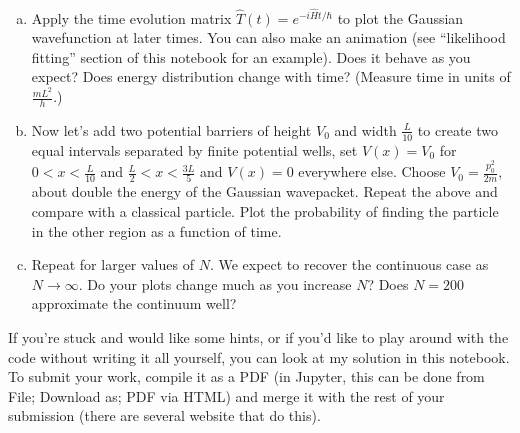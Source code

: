 \documentclass[10pt]{article}
\begin{document}
\begin{enumerate}[(a)]
        \item Apply the time evolution matrix $\hat T(t) = e^{-i\hat H t/\hbar}$ to plot the Gaussian wavefunction at later times. You can also make an animation (see ``likelihood fitting'' section of this notebook for an example). Does it behave as you expect? Does energy distribution change with time? (Measure time in units of $\frac{mL^2}{h}$.)
        \item Now let's add two potential barriers of height $V_0$ and width $\frac{L}{10}$ to create two equal intervals separated by finite potential wells, set $V(x) = V_0$ for $0 < x < \frac{L}{10}$ and $\frac{L}{2} < x < \frac{3L}{5}$ and $V(x) = 0$ everywhere else. Choose $V_0 = \frac{p_0^2}{2m}$, about double the energy of the Gaussian wavepacket. Repeat the above and compare with a classical particle. Plot the probability of finding the particle in the other region as a function of time. 
        \item Repeat for larger values of $N$. We expect to recover the continuous case as $N \to \infty$. Do your plots change much as you increase $N$? Does $N = 200$ approximate the continuum well? 
    \end{enumerate}

    If you're stuck and would like some hints, or if you'd like to play around with the code without writing it all yourself, you can look at my solution in this notebook. To submit your work, compile it as a PDF (in Jupyter, this can be done from File; Download as; PDF via HTML) and merge it with the rest of your submission (there are several website that do this).
\end{document}
